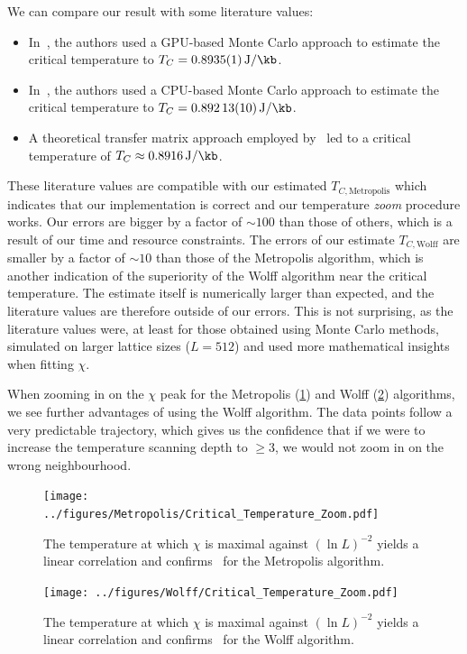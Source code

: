		We can compare our result with some literature values:
		\begin{itemize}
			\item In~\citet{literature_gpu}, the authors used a GPU-based Monte Carlo approach to estimate the critical temperature to $T_C=\SI{0.8935(1)}{\J\per\kb}$.
			\item In~\citet{literature_cpu}, the authors used a CPU-based Monte Carlo approach to estimate the critical temperature to $T_C=\SI{0.89213(10)}{\J\per\kb}$.
			\item A theoretical transfer matrix approach employed by~\cite{literature_theo} led to a critical temperature of $T_C \approx \SI{0.8916}{\J\per\kb}$.
		\end{itemize}
		These literature values are compatible with our estimated $T_{C, \text{Metropolis}}$ which indicates that our implementation is correct and our temperature \emph{zoom} procedure works. Our errors are bigger by a factor of $\sim 100$ than those of others, which is a result of our time and resource constraints. The errors of our estimate $T_{C, \text{Wolff}}$ are smaller by a factor of $\sim 10$ than those of the Metropolis algorithm, which is another indication of the superiority of the Wolff algorithm near the critical temperature. The estimate itself is numerically larger than expected, and the literature values are therefore outside of our errors. This is not surprising, as the literature values were, at least for those obtained using Monte Carlo methods, simulated on larger lattice sizes ($L = 512$) and used more mathematical insights when fitting $\chi$.

		When zooming in on the $\chi$ peak for the Metropolis (\cref{fig:critical_temperature_zoom}) and Wolff (\cref{fig:critical_temperature_wolf_zoom}) algorithms, we see further advantages of  using the Wolff algorithm. The data points follow a very predictable trajectory,  which gives us the confidence that if we were to increase the temperature scanning depth to $\geq 3$, we would not zoom in on the wrong neighbourhood.
		\begin{figure}[htbp]
			\centering
			\texttt{[image: ../figures/Metropolis/Critical\_Temperature\_Zoom.pdf]}
			\caption[Estimating $T_C$ using the Metropolis algorithm by plotting $T$ where $\chi$ is maximal against $(\ln L)^{-2}$]{The temperature at which $\chi$ is maximal against $(\ln L)^{-2}$ yields a linear correlation and confirms~ for the Metropolis algorithm.}
			\label{fig:critical_temperature_zoom}
		\end{figure}
		\begin{figure}[htbp]
			\centering
			\texttt{[image: ../figures/Wolff/Critical\_Temperature\_Zoom.pdf]}
			\caption[Estimating $T_C$ using the Wolff algorithm by plotting $T$ where $\chi$ is maximal against $(\ln L)^{-2}$]{The temperature at which $\chi$ is maximal against $(\ln L)^{-2}$ yields a linear correlation and confirms~ for the Wolff algorithm.}
			\label{fig:critical_temperature_wolf_zoom}
		\end{figure}
